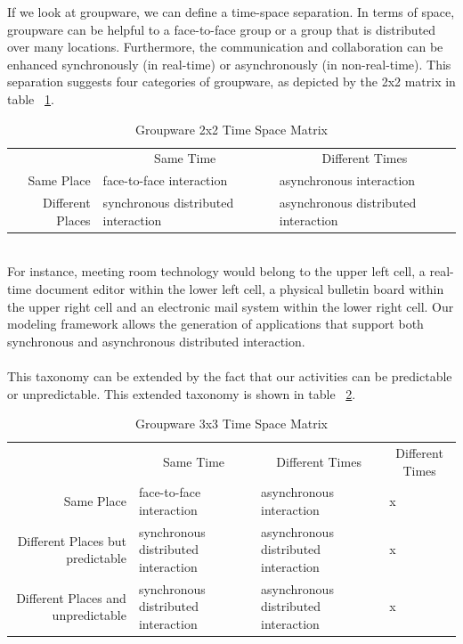 If we look at groupware, we can define a time-space separation. In terms of space, groupware can be helpful to a face-to-face group or a group that is distributed over many locations. Furthermore, the communication and collaboration can be enhanced synchronously (in real-time) or asynchronously (in non-real-time). This separation suggests four categories of groupware, as depicted by the 2x2 matrix in table ~\ref{tab:groupware_taxonomy}.
\begin{table}[h!p!]
\begin{tabular*}{0.75\textwidth}{ r | p{5cm} | p{5cm} |}
\multicolumn{1}{r}{}
 &  \multicolumn{1}{c}{Same Time}
 & \multicolumn{1}{c}{Different Times} \\
\cline{2-3}
Same Place & face-to-face interaction & asynchronous interaction \\
\cline{2-3}
Different Places & synchronous distributed interaction & asynchronous distributed interaction \\
\cline{2-3}
\end{tabular*}
\caption{Groupware 2x2 Time Space Matrix}
\label{tab:groupware_taxonomy}
\end{table}
\\
For instance, meeting room technology would belong to the upper left cell, a real-time document editor within the lower left cell, a physical bulletin board within the upper right cell and an electronic mail system within the lower right cell. Our modeling framework allows the generation of applications that support both synchronous and asynchronous distributed interaction. 
\\ \\
This taxonomy can be extended by the fact that our activities can be predictable or unpredictable. \cite{other_paper_} This extended taxonomy is shown in table ~\ref{tab:ext_taxonomy}.
\begin{table}[h!p!]
\begin{tabular*}{0.75\textwidth}{ r | p{3.30cm} | p{3.30cm} | p{3.30cm} |}
\multicolumn{1}{r}{}
 & \multicolumn{1}{c}{Same Time}
 & \multicolumn{1}{c}{Different Times}
 & \multicolumn{1}{c}{Different Times} \\
\cline{2-4}
Same Place & face-to-face interaction & asynchronous interaction & x \\
\cline{2-4}
Different Places but predictable & synchronous distributed interaction & asynchronous distributed interaction & x \\
\cline{2-4}
Different Places and unpredictable & synchronous distributed interaction & asynchronous distributed interaction & x \\
\cline{2-4}
\end{tabular*}
\caption{Groupware 3x3 Time Space Matrix}
\label{tab:ext_taxonomy}
\end{table}

